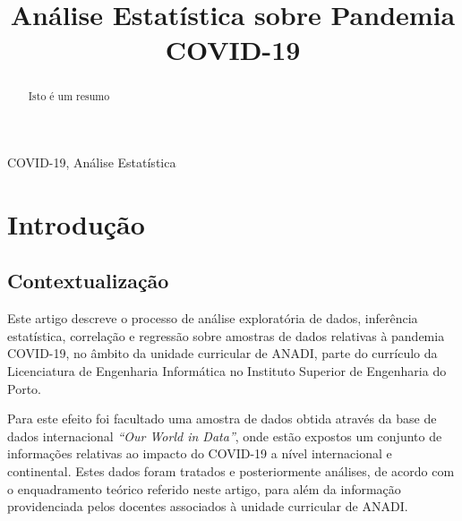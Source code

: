 \documentclass[conference]{IEEEtran}
\begin{document}
\title{Análise Estatística sobre Pandemia COVID-19}

\author{
\and
{}
\and
{}
}

\maketitle

\begin{abstract}
Isto é um resumo
\end{abstract}

\begin{IEEEkeywords}
COVID-19, Análise Estatística
\end{IEEEkeywords}

\section{Introdução}

\subsection{Contextualização}

Este artigo descreve o processo de análise exploratória de dados, inferência estatística, correlação e regressão sobre amostras de dados relativas à pandemia COVID-19, no âmbito da unidade curricular de ANADI, parte do currículo da Licenciatura de Engenharia Informática no Instituto Superior de Engenharia do Porto.

Para este efeito foi facultado uma amostra de dados obtida através da  base de dados internacional \textit{``Our World in Data''}\cite{owidcoronavirus}, onde estão expostos um conjunto de informações relativas ao impacto do COVID-19 a nível internacional e continental. Estes dados foram tratados e posteriormente análises, de acordo com o enquadramento teórico referido neste artigo, para além da informação providenciada pelos docentes associados à unidade curricular de ANADI.
\end{document}
